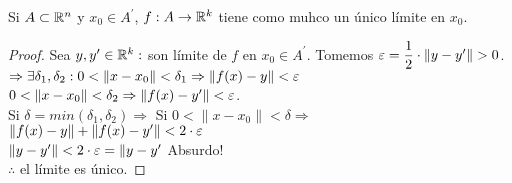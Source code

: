 \begin{lemma}
  Si $A \subset \mathbb{R}^n$ y $x_0 \in A^{\prime}$, $f: A \to \mathbb{R}^k$ tiene como muhco un único límite en $x_0$.
  \begin{proof}
    Sea $y, y^{\prime} \in \mathbb{R}^k : $ son límite de $f$ en $x_0 \in A^{\prime}$. Tomemos $\varepsilon = \dfrac{1}{2} \cdot \|y - y^{\prime}\| > 0$. \\
    $\Rightarrow \exists \delta_1, \delta_2 : 0 < \| x - x_0 \| < \delta_1 \Rightarrow \|f(x) - y \| < \varepsilon$ \\
    $0 < \|x - x_0\| < \delta_2 \Rightarrow \|f(x) - y^{\prime}\| < \varepsilon$. \\
    Si $\delta = min(\delta_1, \delta_2) \Rightarrow$ Si $0 < \|x - x_0\| < \delta \Rightarrow$ \\
    $\|f(x) - y\| + \|f(x) - y^{\prime}\| < 2 \cdot \varepsilon$ \\
    $\|y - y^{\prime}\| < 2 \cdot \varepsilon = \|y - y^{\prime}$ Absurdo! \\
    $\therefore$ el límite es único.
  \end{proof}
\end{lemma}

\clearpage

